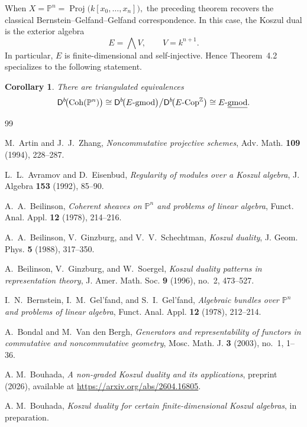 \documentclass[11pt]{article}
\newtheorem{corollary}[theorem]{Corollary}
\theoremstyle{definition}
\theoremstyle{remark}
\begin{document}
When
\( 
X=\mathbb{P}^{n}
=
\operatorname{Proj}\!\bigl(k[x_{0},\dots,x_{n}]\bigr),
\)
the preceding theorem recovers the classical
Bernstein--Gelfand--Gelfand correspondence. In this case, the Koszul dual is
the exterior algebra
\[
E=\bigwedge V,
\qquad
V=k^{n+1}.
\]
In particular, \(E\) is finite-dimensional and self-injective. Hence
Theorem~4.2 specializes to the following statement.

\begin{corollary}
There are triangulated equivalences
\[
\mathsf{D}^{b}\!\bigl(\operatorname{Coh}(\mathbb{P}^{n})\bigr)
\cong
\mathsf{D}^{b}\!\bigl(E\textup{-}\mathrm{gmod}\bigr)
\big/
\mathsf{D}^{b}\!\bigl(E\textup{-Cop}^{\mathbb{Z}}\bigr)
\cong
E\textup{-}\underline{\mathrm{gmod}}.
\]
\end{corollary}

\begin{thebibliography}{99}

M.~Artin and J.~J.~Zhang,
\emph{Noncommutative projective schemes},
Adv. Math. \textbf{109} (1994), 228--287.

L.~L.~Avramov and D.~Eisenbud,
\emph{Regularity of modules over a Koszul algebra},
J. Algebra \textbf{153} (1992), 85--90.

A.~A.~Beilinson,
\emph{Coherent sheaves on \(\mathbb{P}^{n}\) and problems of linear algebra},
Funct. Anal. Appl. \textbf{12} (1978), 214--216.

A.~A.~Beilinson, V.~Ginzburg, and V.~V.~Schechtman,
\emph{Koszul duality},
J. Geom. Phys. \textbf{5} (1988), 317--350.

A.~Beilinson, V.~Ginzburg, and W.~Soergel,
\emph{Koszul duality patterns in representation theory},
J. Amer. Math. Soc. \textbf{9} (1996), no.~2, 473--527.

I.~N.~Bernstein, I.~M.~Gel'fand, and S.~I.~Gel'fand,
\emph{Algebraic bundles over \(\mathbb{P}^n\) and problems of linear algebra},
Funct. Anal. Appl. \textbf{12} (1978), 212--214.

A.~Bondal and M.~Van den Bergh,
\emph{Generators and representability of functors in commutative and noncommutative geometry},
Mosc. Math. J. \textbf{3} (2003), no.~1, 1--36.

A. M.~Bouhada,
\emph{A non-graded Koszul duality and its applications},
preprint (2026), available at \url{https://arxiv.org/abs/2604.16805}.

A. M.~Bouhada,
\emph{Koszul duality for certain finite-dimensional Koszul algebras},
in preparation.


\end{thebibliography}
\end{document}
